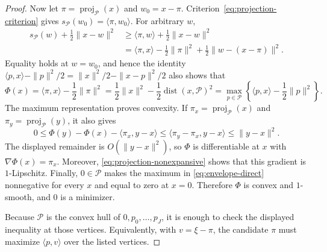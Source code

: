 \documentclass[11pt]{article}
\theoremstyle{definition}
\theoremstyle{remark}
\newcommand{\dist}{\operatorname{dist}}
\begin{document}
\begin{proof}
Now let \(\pi=\operatorname{proj}_{\mathcal P}(x)\) and
\(w_0=x-\pi\).  Criterion~\eqref{eq:projection-criterion} gives
\(s_{\mathcal P}(w_0)=\langle\pi,w_0\rangle\).  For arbitrary \(w\),
\[
\begin{aligned}
 s_{\mathcal P}(w)+\frac12\|x-w\|^2
 &\ge \langle\pi,w\rangle+\frac12\|x-w\|^2\\
 &=\langle\pi,x\rangle-\frac12\|\pi\|^2
   +\frac12\|w-(x-\pi)\|^2.
\end{aligned}
\]
Equality holds at \(w=w_0\), and hence
the identity
\(\langle p,x\rangle-\|p\|^2/2
=\|x\|^2/2-\|x-p\|^2/2\) also shows that
\begin{equation}
 \Phi(x)
 =\langle\pi,x\rangle-\frac12\|\pi\|^2
 =\frac12\|x\|^2-\frac12\dist(x,\mathcal P)^2
 =\max_{p\in\mathcal P}
   \left\{\langle p,x\rangle-\frac12\|p\|^2\right\}.
 \label{eq:envelope-direct}
\end{equation}
The maximum representation proves convexity.  If
\(\pi_x=\operatorname{proj}_{\mathcal P}(x)\) and
\(\pi_y=\operatorname{proj}_{\mathcal P}(y)\), it also gives
\[
 0\le
 \Phi(y)-\Phi(x)-\langle\pi_x,y-x\rangle
 \le\langle\pi_y-\pi_x,y-x\rangle
 \le\|y-x\|^2.
\]
The displayed remainder is \(O(\|y-x\|^2)\), so \(\Phi\) is differentiable
at \(x\) with \(\nabla\Phi(x)=\pi_x\).  Moreover,
\eqref{eq:projection-nonexpansive} shows that this gradient is
\(1\)-Lipschitz.  Finally, \(0\in\mathcal P\) makes the maximum in
\eqref{eq:envelope-direct} nonnegative for every \(x\) and equal to zero at
\(x=0\).  Therefore \(\Phi\) is convex and \(1\)-smooth, and \(0\) is a
minimizer.

Because \(\mathcal P\) is the convex hull of \(0,p_0,\ldots,p_J\), it is enough
to check the displayed inequality at those vertices.  Equivalently, with
\(v=\xi-\pi\), the candidate \(\pi\) must maximize \(\langle p,v\rangle\)
over the listed vertices.


\end{proof}
\end{document}
